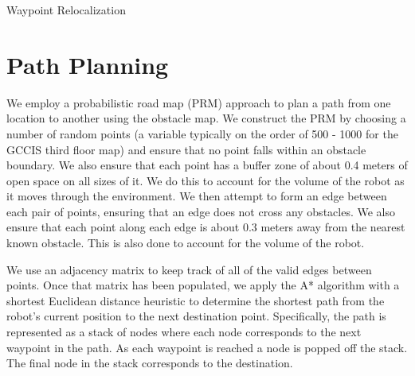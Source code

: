\documentclass[12pt]{article}
\begin{document}
\begin{algorithm}[H]
\caption{Waypoint Relocalization}
\label{alg:waypointloc}
\begin{algorithmic}[1]

	\ENDIF
\ENDIF

\end{algorithmic}
\end{algorithm}


\section{Path Planning}

We employ a probabilistic road map (PRM) approach to plan a path from one location to another using the obstacle map. We construct the PRM by choosing a number of random points (a variable typically on the order of 500 - 1000 for the GCCIS third floor map) and ensure that no point falls within an obstacle boundary. We also ensure that each point has a buffer zone of about 0.4 meters of open space on all sizes of it. We do this to account for the volume of the robot as it moves through the environment. We then attempt to form an edge between each pair of points, ensuring that an edge does not cross any obstacles. We also ensure that each point along each edge is about 0.3 meters away from the nearest known obstacle. This is also done to account for the volume of the robot. 

We use an adjacency matrix to keep track of all of the valid edges between points. Once that matrix has been populated, we apply the A* algorithm with a shortest Euclidean distance heuristic to determine the shortest path from the robot's current position to the next destination point. Specifically, the path is represented as a stack of nodes where each node corresponds to the next waypoint in the path. As each waypoint is reached a node is popped off the stack. The final node in the stack corresponds to the destination.
\end{document}
